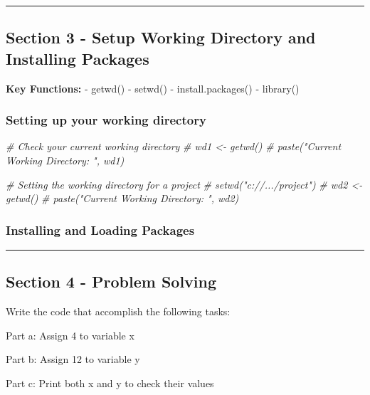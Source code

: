 \documentclass[
]{article}
\newenvironment{Shaded}{\begin{snugshade}}{\end{snugshade}}
\newcommand{\CommentTok}[1]{\textcolor[rgb]{0.56,0.35,0.01}{\textit{#1}}}
\begin{document}
\begin{center}\rule{0.5\linewidth}{0.5pt}\end{center}

\subsection{Section 3 - Setup Working Directory and Installing
Packages}\label{section-3---setup-working-directory-and-installing-packages}

\textbf{Key Functions:} - getwd() - setwd() - install.packages() -
library()

\subsubsection{Setting up your working
directory}\label{setting-up-your-working-directory}

\begin{Shaded}
\begin{Highlighting}[]
\CommentTok{\# Check your current working directory}
\CommentTok{\# wd1 \textless{}{-} getwd()}
\CommentTok{\# paste("Current Working Directory: ", wd1)}

\CommentTok{\# Setting the working directory for a project}
\CommentTok{\# setwd("c://.../project")}
\CommentTok{\# wd2 \textless{}{-} getwd()}
\CommentTok{\# paste("Current Working Directory: ", wd2)}
\end{Highlighting}
\end{Shaded}

\subsubsection{Installing and Loading
Packages}\label{installing-and-loading-packages}

\begin{center}\rule{0.5\linewidth}{0.5pt}\end{center}

\subsection{Section 4 - Problem
Solving}\label{section-4---problem-solving}

Write the code that accomplish the following tasks:

Part a: Assign 4 to variable x

Part b: Assign 12 to variable y

Part c: Print both x and y to check their values
\end{document}
